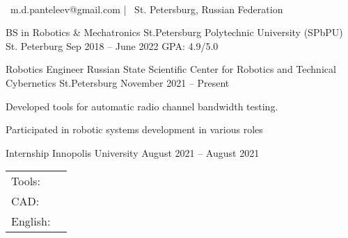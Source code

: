 \documentclass[]{awesome-cv}
\begin{document}
    
\begin{center}
	  \\
	\vspace{2mm}
	{\faEnvelope\ m.d.panteleev@gmail.com} | {\faMapMarker\ St. Petersburg, Russian Federation}
\end{center}
\begin{cventries}
	\cventry
	{BS in Robotics \& Mechatronics}
	{St.Petersburg Polytechnic University (SPbPU)}
	{St. Peterburg}
	{Sep 2018 – June 2022}
	{GPA: 4.9/5.0}
\end{cventries}

\vspace{-2mm}
\begin{cventries}
	\cventry
	{Robotics Engineer}
	{Russian State Scientific Center for Robotics and Technical Cybernetics}
	{St.Petersburg}
	{November 2021 – Present}
	{\begin{cvitems}
		\item {Developed tools for automatic radio channel bandwidth testing.}
		\item {Participated in robotic systems development in various roles}
		\end{cvitems}}
	\cventry
	{Internship}
	{Innopolis University}
	{}
	{August 2021 – August 2021}
	{}
\end{cventries}
\begin{cventries}
	\cventry
	{}
	{\def\arraystretch{1.15}{\begin{tabular}{ l l }
		Tools:  & {\skill{ C/C++, Python, ROS, OpenCV, Matlab, Embedded Development}} \\
		CAD:  & {\skill{ Fusion 360, Altium Designer, Solidworks, Visual Components}} \\
		English:  & {\skill{ C1 (IELTS 8.0)}} \\
		\end{tabular}}}
	{}
	{}
	{}
\end{cventries}
\end{document}
